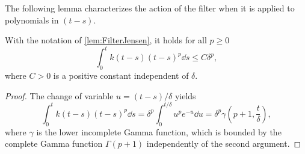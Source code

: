 \documentclass[review,onefignum,onetabnum]{siamonline190516}
\begin{document}
\begin{appendices}
The following lemma characterizes the action of the filter when it is applied to polynomials in $(t-s)$.
\begin{lemma}\label{lem:FilterPoly} With the notation of \cref{lem:FilterJensen}, it holds for all $p \geq 0$
	\begin{equation}
		\int_0^t k(t-s)(t-s)^p \dd s \leq C \delta^p,
	\end{equation}
	where $C > 0$ is a positive constant independent of $\delta$.
\end{lemma}
\begin{proof} The change of variable $u = (t-s)/\delta$ yields
	\begin{equation}
		\int_0^t k(t-s)(t-s)^p \dd s = \delta^p \int_0^{t/\delta} u^p e^{-u} \dd u = \delta^p \gamma\left(p+1, \frac{t}{\delta}\right),
	\end{equation}
	where $\gamma$ is the lower incomplete Gamma function, which is bounded by the complete Gamma function $\Gamma(p+1)$ independently of the second argument.
\end{proof}



\end{appendices}
\end{document}
